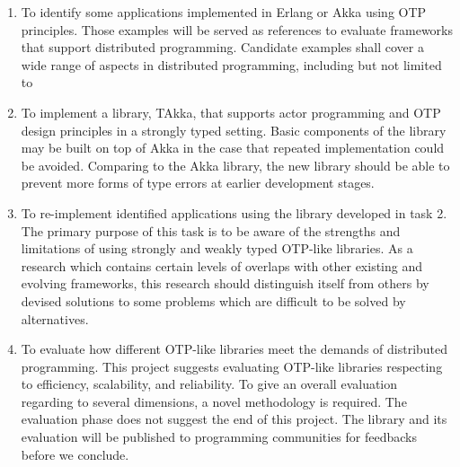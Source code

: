 \begin{enumerate}
  \item To identify some applications implemented in Erlang or Akka using OTP principles.  Those examples will be served as references to evaluate frameworks that support distributed programming.  Candidate examples shall cover a wide range of aspects in distributed programming, including but not limited to 
    
  \item To implement a library, TAkka, that supports actor programming and OTP design principles in a strongly typed setting.  Basic components of the library may be built on top of Akka\cite{akka_doc} in the case that repeated implementation could be avoided.  Comparing to the Akka library, the new library should be able to prevent more forms of type errors at earlier development stages.
    
  \item To re-implement identified applications using the library developed in task 2.  The primary purpose of this task is to be aware of the strengths and limitations of using strongly and weakly typed OTP-like libraries.  As a research which contains certain levels of overlaps with other existing and evolving frameworks, this research should distinguish itself from others by devised solutions to some problems which are difficult to be solved by alternatives.

  \item To evaluate how different OTP-like libraries meet the demands of distributed programming.  This project suggests evaluating OTP-like libraries respecting to efficiency, scalability, and reliability.  To give an overall evaluation regarding to several dimensions, a novel methodology is required.  The evaluation phase does not suggest the end of this project.  The library and its evaluation will be published to programming communities for feedbacks before we conclude.
\end{enumerate}



